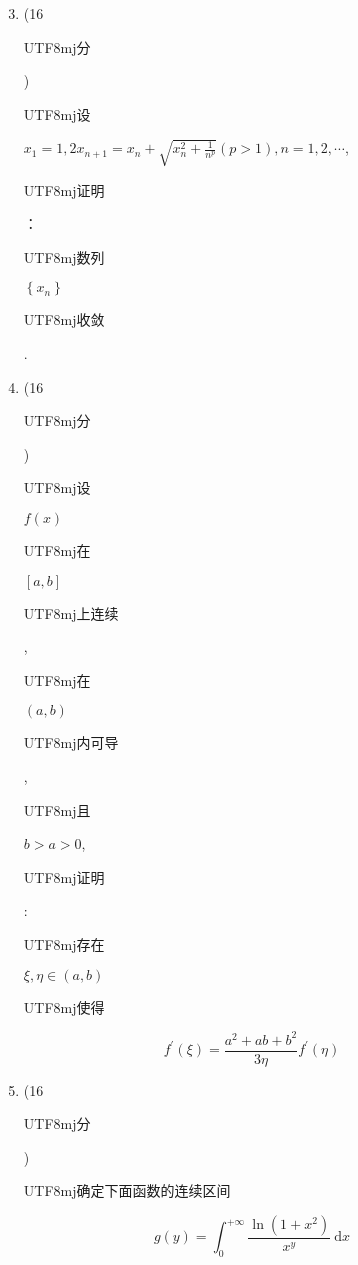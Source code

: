 \documentclass[10pt]{article}
\begin{document}
\begin{enumerate}
  \setcounter{enumi}{2}
  \item (16 \begin{CJK}{UTF8}{mj}分\end{CJK}) \begin{CJK}{UTF8}{mj}设\end{CJK} $x_{1}=1,2 x_{n+1}=x_{n}+\sqrt{x_{n}^{2}+\frac{1}{n^{p}}}(p>1), n=1,2, \cdots$, \begin{CJK}{UTF8}{mj}证明\end{CJK}：\begin{CJK}{UTF8}{mj}数列\end{CJK} $\left\{x_{n}\right\}$ \begin{CJK}{UTF8}{mj}收敛\end{CJK}.

  \item (16 \begin{CJK}{UTF8}{mj}分\end{CJK}) \begin{CJK}{UTF8}{mj}设\end{CJK} $f(x)$ \begin{CJK}{UTF8}{mj}在\end{CJK} $[a, b]$ \begin{CJK}{UTF8}{mj}上连续\end{CJK}, \begin{CJK}{UTF8}{mj}在\end{CJK} $(a, b)$ \begin{CJK}{UTF8}{mj}内可导\end{CJK}, \begin{CJK}{UTF8}{mj}且\end{CJK} $b>a>0$, \begin{CJK}{UTF8}{mj}证明\end{CJK}: \begin{CJK}{UTF8}{mj}存在\end{CJK} $\xi, \eta \in(a, b)$ \begin{CJK}{UTF8}{mj}使得\end{CJK}

\end{enumerate}
$$
f^{\prime}(\xi)=\frac{a^{2}+a b+b^{2}}{3 \eta} f^{\prime}(\eta)
$$

\begin{enumerate}
  \setcounter{enumi}{4}
  \item (16 \begin{CJK}{UTF8}{mj}分\end{CJK}) \begin{CJK}{UTF8}{mj}确定下面函数的连续区间\end{CJK}
\end{enumerate}
$$
g(y)=\int_{0}^{+\infty} \frac{\ln \left(1+x^{2}\right)}{x^{y}} \mathrm{~d} x
$$
\end{document}
